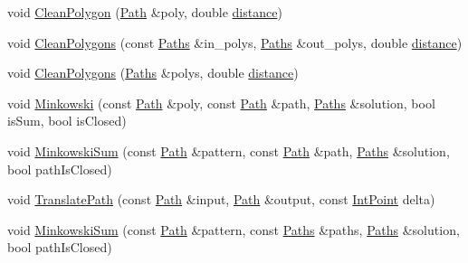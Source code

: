 \begin{DoxyCompactItemize}
\item 
void \mbox{\hyperlink{namespace_clipper_lib_a819f3ac34feed7ca8c64c54bc534eb1b}{Clean\+Polygon}} (\mbox{\hyperlink{namespace_clipper_lib_af39c8fe00f278f18cc8142fef41242da}{Path}} \&poly, double \mbox{\hyperlink{unwrapping_8cc_abf82b59ef33c7549580276e00ae85d18}{distance}})
\item 
void \mbox{\hyperlink{namespace_clipper_lib_a770cbc6ce4f16d02b8fe27c5abf6159c}{Clean\+Polygons}} (const \mbox{\hyperlink{namespace_clipper_lib_a4bab1d9e10805fa6f1fd3b78c56efcfe}{Paths}} \&in\+\_\+polys, \mbox{\hyperlink{namespace_clipper_lib_a4bab1d9e10805fa6f1fd3b78c56efcfe}{Paths}} \&out\+\_\+polys, double \mbox{\hyperlink{unwrapping_8cc_abf82b59ef33c7549580276e00ae85d18}{distance}})
\item 
void \mbox{\hyperlink{namespace_clipper_lib_aeee397f9f7e7cb5f0bb4723b7c4969e9}{Clean\+Polygons}} (\mbox{\hyperlink{namespace_clipper_lib_a4bab1d9e10805fa6f1fd3b78c56efcfe}{Paths}} \&polys, double \mbox{\hyperlink{unwrapping_8cc_abf82b59ef33c7549580276e00ae85d18}{distance}})
\item 
void \mbox{\hyperlink{namespace_clipper_lib_a63c9e744bc436b681c98c2f238e22455}{Minkowski}} (const \mbox{\hyperlink{namespace_clipper_lib_af39c8fe00f278f18cc8142fef41242da}{Path}} \&poly, const \mbox{\hyperlink{namespace_clipper_lib_af39c8fe00f278f18cc8142fef41242da}{Path}} \&path, \mbox{\hyperlink{namespace_clipper_lib_a4bab1d9e10805fa6f1fd3b78c56efcfe}{Paths}} \&solution, bool is\+Sum, bool is\+Closed)
\item 
void \mbox{\hyperlink{namespace_clipper_lib_ad12b5697c25579dce65d369a2e3cf608}{Minkowski\+Sum}} (const \mbox{\hyperlink{namespace_clipper_lib_af39c8fe00f278f18cc8142fef41242da}{Path}} \&pattern, const \mbox{\hyperlink{namespace_clipper_lib_af39c8fe00f278f18cc8142fef41242da}{Path}} \&path, \mbox{\hyperlink{namespace_clipper_lib_a4bab1d9e10805fa6f1fd3b78c56efcfe}{Paths}} \&solution, bool path\+Is\+Closed)
\item 
void \mbox{\hyperlink{namespace_clipper_lib_a3fd004390023c8780f3b60e728d8ab8f}{Translate\+Path}} (const \mbox{\hyperlink{namespace_clipper_lib_af39c8fe00f278f18cc8142fef41242da}{Path}} \&input, \mbox{\hyperlink{namespace_clipper_lib_af39c8fe00f278f18cc8142fef41242da}{Path}} \&output, const \mbox{\hyperlink{struct_clipper_lib_1_1_int_point}{Int\+Point}} delta)
\item 
void \mbox{\hyperlink{namespace_clipper_lib_ae4893aa579fd7c46ce695fd3d1c66e64}{Minkowski\+Sum}} (const \mbox{\hyperlink{namespace_clipper_lib_af39c8fe00f278f18cc8142fef41242da}{Path}} \&pattern, const \mbox{\hyperlink{namespace_clipper_lib_a4bab1d9e10805fa6f1fd3b78c56efcfe}{Paths}} \&paths, \mbox{\hyperlink{namespace_clipper_lib_a4bab1d9e10805fa6f1fd3b78c56efcfe}{Paths}} \&solution, bool path\+Is\+Closed)

\end{DoxyCompactItemize}
